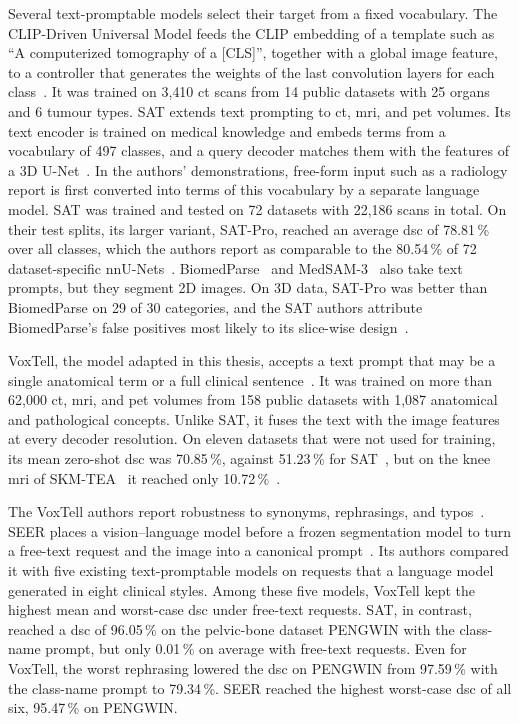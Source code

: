 Several text-promptable models select their target from a fixed vocabulary.
The CLIP-Driven Universal Model feeds the CLIP embedding of a template such as ``A computerized tomography of a [CLS]'', together with a global image feature, to a controller that generates the weights of the last convolution layers for each class~\cite{Liu_2023}.
It was trained on 3{,}410 \gls{ct} scans from 14 public datasets with 25 organs and 6 tumour types.
SAT extends text prompting to \gls{ct}, \gls{mri}, and \gls{pet} volumes.
Its text encoder is trained on medical knowledge and embeds terms from a vocabulary of 497 classes, and a query decoder matches them with the features of a 3D U-Net~\cite{zhao2025sat}.
In the authors' demonstrations, free-form input such as a radiology report is first converted into terms of this vocabulary by a separate language model.
SAT was trained and tested on 72 datasets with 22{,}186 scans in total.
On their test splits, its larger variant, SAT-Pro, reached an average \gls{dsc} of 78.81\,\% over all classes, which the authors report as comparable to the 80.54\,\% of 72 dataset-specific nnU-Nets~\cite[Suppl.~Table~3]{zhao2025sat}.
BiomedParse~\cite{zhao2025foundation-9de} and MedSAM-3~\cite{liu2026medsam3delvingsegmentmedical} also take text prompts, but they segment 2D images.
On 3D data, SAT-Pro was better than BiomedParse on 29 of 30 categories, and the SAT authors attribute BiomedParse's false positives most likely to its slice-wise design~\cite{zhao2025sat}.

VoxTell, the model adapted in this thesis, accepts a text prompt that may be a single anatomical term or a full clinical sentence~\cite{rokuss2025voxtellfreetextpromptableuniversal}.
It was trained on more than 62{,}000 \gls{ct}, \gls{mri}, and \gls{pet} volumes from 158 public datasets with 1{,}087 anatomical and pathological concepts.
Unlike SAT, it fuses the text with the image features at every decoder resolution.
On eleven datasets that were not used for training, its mean zero-shot \gls{dsc} was 70.85\,\%, against 51.23\,\% for SAT~\cite[Table~1]{rokuss2025voxtellfreetextpromptableuniversal}, but on the knee \gls{mri} of SKM-TEA~\cite{desai2021skmtea} it reached only 10.72\,\%~\cite[Suppl.~Table~9]{rokuss2025voxtellfreetextpromptableuniversal}.

The VoxTell authors report robustness to synonyms, rephrasings, and typos~\cite{rokuss2025voxtellfreetextpromptableuniversal}.
SEER places a vision--language model before a frozen segmentation model to turn a free-text request and the image into a canonical prompt~\cite{zhang2026seer}.
Its authors compared it with five existing text-promptable models on requests that a language model generated in eight clinical styles.
Among these five models, VoxTell kept the highest mean and worst-case \gls{dsc} under free-text requests.
SAT, in contrast, reached a \gls{dsc} of 96.05\,\% on the pelvic-bone dataset PENGWIN with the class-name prompt, but only 0.01\,\% on average with free-text requests.
Even for VoxTell, the worst rephrasing lowered the \gls{dsc} on PENGWIN from 97.59\,\% with the class-name prompt to 79.34\,\%.
SEER reached the highest worst-case \gls{dsc} of all six, 95.47\,\% on PENGWIN.
